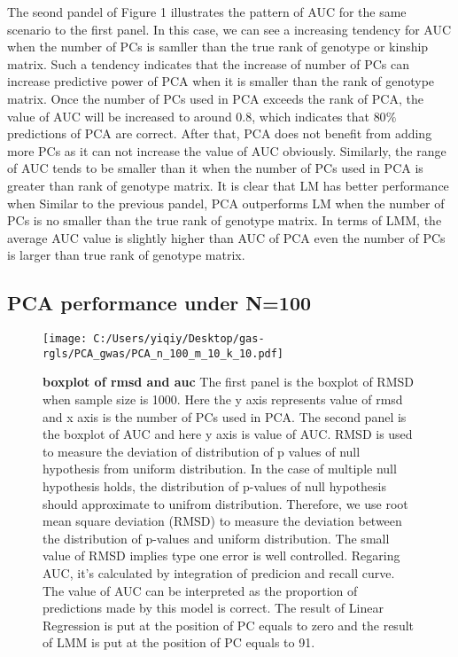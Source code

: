 \documentclass[12pt]{article}
\begin{document}
The seond pandel of Figure 1 illustrates the pattern of AUC for the same scenario to the first panel. In this case, we can see a increasing tendency for AUC when the number of PCs is samller than the true rank of genotype or kinship matrix. Such a tendency indicates that the increase of number of PCs can increase predictive power of PCA when it is smaller than the rank of genotype matrix. Once the number of PCs used in PCA exceeds the rank of PCA, the value of AUC will be increased to around 0.8, which indicates that $80\%$ predictions of PCA are correct. After that, PCA does not benefit from adding more PCs as it can not increase the value of AUC obviously. Similarly, the range of AUC tends to be smaller than it when the number of PCs used in PCA is greater than rank of genotype matrix. It is clear that LM has better performance when  Similar to the previous pandel, PCA outperforms LM when the number of PCs is no smaller than the true rank of genotype matrix. In terms of LMM, the average AUC value is slightly higher than AUC of PCA even the number of PCs is larger than true rank of genotype matrix. \\


\subsection{PCA performance under N=100}
\begin{figure}[bp!]
  \centering
  \texttt{[image: C:/Users/yiqiy/Desktop/gas-rgls/PCA\_gwas/PCA\_n\_100\_m\_10\_k\_10.pdf]}
  \caption{
    {\bf boxplot of rmsd and auc}
    The first panel is the boxplot of RMSD when sample size is 1000. Here the y axis represents value of rmsd and x axis is the number of PCs used in PCA.
    The second panel is the boxplot of AUC and here y axis is value of AUC. RMSD is used to measure the deviation of distribution of p values of null hypothesis from uniform distribution. In the case of multiple null hypothesis holds, the distribution of p-values of null hypothesis should approximate to unifrom distribution. Therefore, we use root mean square deviation (RMSD) to measure the deviation between the distribution of p-values and uniform distribution. The small value of RMSD implies type one error is well controlled. Regaring AUC, it's calculated by integration of predicion and recall curve. The value of AUC can be interpreted as the proportion of predictions made by this model is correct. The result of Linear Regression is put at the position of PC equals to zero and the result of LMM is put at the position of PC equals to 91.}
  \label{fig:example}
\end{figure}
\end{document}
